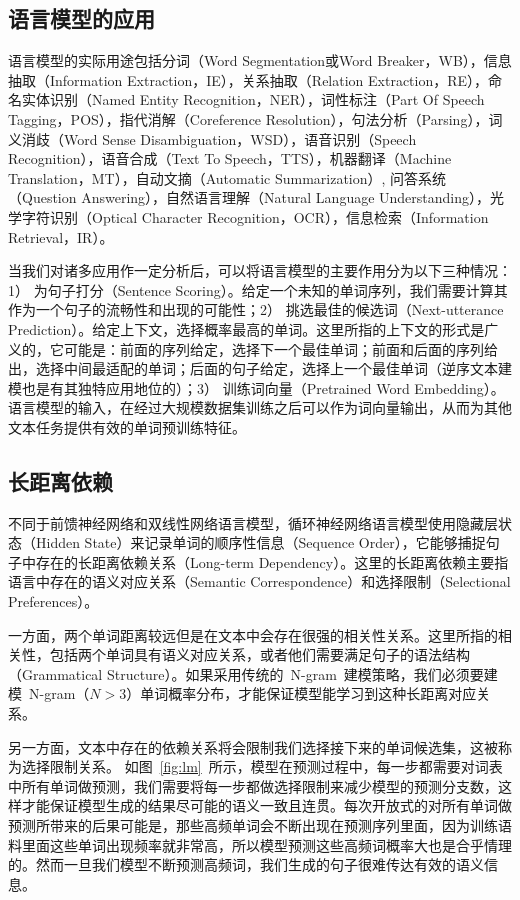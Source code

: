 \subsection{语言模型的应用}
语言模型的实际用途包括分词（Word Segmentation或Word Breaker，WB），信息抽取（Information Extraction，IE），关系抽取（Relation Extraction，RE），命名实体识别（Named Entity Recognition，NER），词性标注（Part Of Speech Tagging，POS），指代消解（Coreference Resolution），句法分析（Parsing），词义消歧（Word Sense Disambiguation，WSD），语音识别（Speech Recognition），语音合成（Text To Speech，TTS），机器翻译（Machine Translation，MT），自动文摘（Automatic Summarization）, 问答系统（Question Answering），自然语言理解（Natural Language Understanding），光学字符识别（Optical Character Recognition，OCR），信息检索（Information Retrieval，IR）。

当我们对诸多应用作一定分析后，可以将语言模型的主要作用分为以下三种情况：1） 为句子打分（Sentence Scoring）。给定一个未知的单词序列，我们需要计算其作为一个句子的流畅性和出现的可能性；2） 挑选最佳的候选词（Next-utterance Prediction）。给定上下文，选择概率最高的单词。这里所指的上下文的形式是广义的，它可能是：前面的序列给定，选择下一个最佳单词；前面和后面的序列给出，选择中间最适配的单词；后面的句子给定，选择上一个最佳单词（逆序文本建模也是有其独特应用地位的）；3） 训练词向量（Pretrained Word Embedding）。语言模型的输入，在经过大规模数据集训练之后可以作为词向量输出，从而为其他文本任务提供有效的单词预训练特征。

\subsection{长距离依赖}
不同于前馈神经网络和双线性网络语言模型，循环神经网络语言模型使用隐藏层状态（Hidden State）来记录单词的顺序性信息（Sequence Order），它能够捕捉句子中存在的长距离依赖关系（Long-term Dependency）。这里的长距离依赖主要指语言中存在的语义对应关系（Semantic Correspondence）和选择限制（Selectional Preferences）。

一方面，两个单词距离较远但是在文本中会存在很强的相关性关系。这里所指的相关性，包括两个单词具有语义对应关系，或者他们需要满足句子的语法结构（Grammatical Structure）。如果采用传统的~N-gram~建模策略，我们必须要建模~N-gram（$N>3$）单词概率分布，才能保证模型能学习到这种长距离对应关系。

另一方面，文本中存在的依赖关系将会限制我们选择接下来的单词候选集，这被称为选择限制关系。
如图~\ref{fig:lm}~所示，模型在预测过程中，每一步都需要对词表中所有单词做预测，我们需要将每一步都做选择限制来减少模型的预测分支数，这样才能保证模型生成的结果尽可能的语义一致且连贯。每次开放式的对所有单词做预测所带来的后果可能是，那些高频单词会不断出现在预测序列里面，因为训练语料里面这些单词出现频率就非常高，所以模型预测这些高频词概率大也是合乎情理的。然而一旦我们模型不断预测高频词，我们生成的句子很难传达有效的语义信息。

